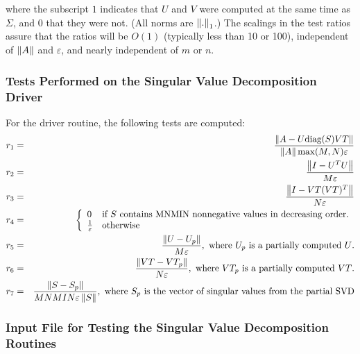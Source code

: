 where the subscript $1$ indicates that $U$ and $V$
were computed at the same time as $\Sigma$,
and $0$ that they were not.
(All norms are $\left\|{.}\right\|_1$.)
The scalings in the test ratios assure that the ratios will be $O(1)$
(typically less than 10 or 100),
independent of $\left\| A\right\|$ and $\varepsilon$,
and nearly independent of $m$ or $n$.


\subsubsection{Tests Performed on the Singular Value Decomposition Driver}

\dent
For the driver routine, the following tests are computed:
\begin{eqnarray}
   r_1 &=& \frac{ \left\| A - U \mbox{diag}(S) VT \right\| }
                { \left\| A\right\| \max(M,N) \varepsilon } \nonumber\\
   r_2 &=& \frac{ \left\| I - U^T U \right\| }
	        { M \varepsilon } \nonumber\\
   r_3 &=& \frac{ \left\| I - VT (VT)^T \right\| }
	        { N \varepsilon } \nonumber\\
   r_4 &=&  \left\{
                  \begin{array}{ll}
		    0 & \mbox{if $S$ contains MNMIN nonnegative values
                          in decreasing order.} \\
		    \frac{1}{\varepsilon} & \mbox{otherwise}
		  \end{array}
	     \right. \nonumber\\
   r_5 &=& \frac{ \left\| U - U_p \right\| }
	        { M \varepsilon },
                \mbox{\ where $U_p$ is a partially computed $U$.} \nonumber\\
   r_6 &=& \frac{ \left\| VT - VT_p \right\| }
	        { N \varepsilon },
		\mbox{\ where $VT_p$ is a partially computed $VT$.} \nonumber\\
   r_7 &=& \frac{ \left\| S - S_p \right\| }
	        { MNMIN \varepsilon \left\| S\right\| },
		\mbox{\ where $S_p$ is the vector of singular values from
		       the partial SVD} \nonumber
\end{eqnarray}

\subsubsection{Input File for Testing the
               Singular Value Decomposition Routines}

